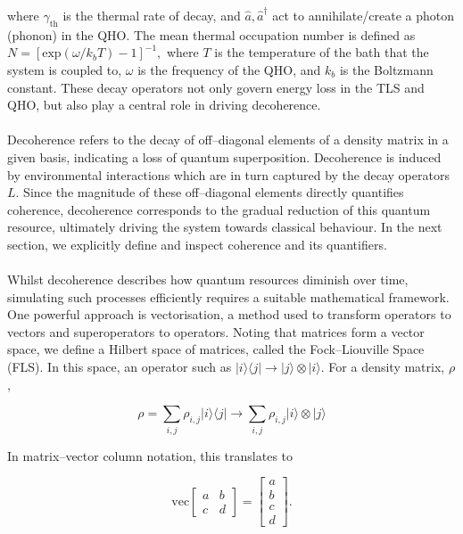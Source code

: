 \documentclass[11pt]{article}
\begin{document}
where $\gamma_{\scriptscriptstyle \text{th}}$ is the thermal rate of decay, and $\hat{a},\hat{a}^\dagger$ act to annihilate/create a photon (phonon) in the QHO. The mean thermal occupation number is defined as $N = [\text{exp}(\omega/k_bT) -1]^{-1},$ where $T$ is the temperature of the bath that the system is coupled to, $\omega$ is the frequency of the QHO, and $k_b$ is the Boltzmann constant. These decay operators not only govern energy loss in the TLS and QHO, but also play a central role in driving decoherence.\\
\\
Decoherence refers to the decay of off--diagonal elements of a density matrix in a given basis, indicating a loss of quantum superposition. Decoherence is induced by environmental interactions which are in turn captured by the decay operators $L$. Since the magnitude of these off–diagonal elements directly quantifies coherence, decoherence corresponds to the gradual reduction of this quantum resource, ultimately driving the system towards classical behaviour. In the next section, we explicitly define and inspect coherence and its quantifiers. \\
\\
Whilst decoherence describes how quantum resources diminish over time, simulating such processes efficiently requires a suitable mathematical framework. One powerful approach is vectorisation, a method used to transform operators to vectors and superoperators to operators. Noting that matrices form a vector space, we define a Hilbert space of matrices, called the Fock--Liouville Space (FLS). In this space, an operator such as $|i\rangle\langle j| \rightarrow |j\rangle \otimes |i\rangle$. For a density matrix, $\rho$, 

\begin{equation*}
    \rho = \sum_{i,j}\rho_{i,j}|i\rangle\langle j| \rightarrow \sum_{i,j}\rho_{i,j}|i\rangle\otimes |j\rangle
\end{equation*}

In matrix--vector column notation, this translates to 

\begin{equation*}
    \text{vec}\begin{bmatrix}
        a & b \\
        c & d
    \end{bmatrix}
    = \begin{bmatrix}
        a\\
        b\\
        c\\
        d
    \end{bmatrix}.
\end{equation*}
\end{document}
